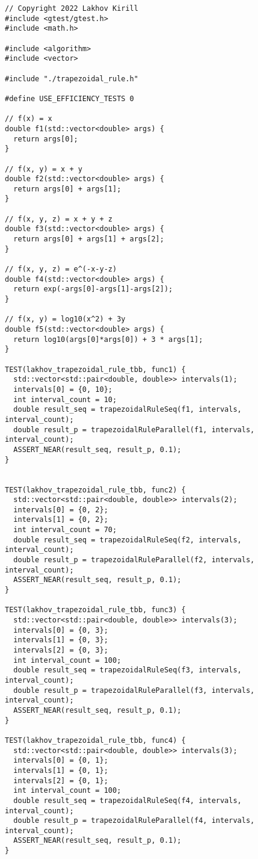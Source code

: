 \documentclass{report}
\begin{document}
\begin{lstlisting}
// Copyright 2022 Lakhov Kirill
#include <gtest/gtest.h>
#include <math.h>

#include <algorithm>
#include <vector>

#include "./trapezoidal_rule.h"

#define USE_EFFICIENCY_TESTS 0

// f(x) = x
double f1(std::vector<double> args) {
  return args[0];
}

// f(x, y) = x + y
double f2(std::vector<double> args) {
  return args[0] + args[1];
}

// f(x, y, z) = x + y + z
double f3(std::vector<double> args) {
  return args[0] + args[1] + args[2];
}

// f(x, y, z) = e^(-x-y-z)
double f4(std::vector<double> args) {
  return exp(-args[0]-args[1]-args[2]);
}

// f(x, y) = log10(x^2) + 3y
double f5(std::vector<double> args) {
  return log10(args[0]*args[0]) + 3 * args[1];
}

TEST(lakhov_trapezoidal_rule_tbb, func1) {
  std::vector<std::pair<double, double>> intervals(1);
  intervals[0] = {0, 10};
  int interval_count = 10;
  double result_seq = trapezoidalRuleSeq(f1, intervals, interval_count);
  double result_p = trapezoidalRuleParallel(f1, intervals, interval_count);
  ASSERT_NEAR(result_seq, result_p, 0.1);
}


TEST(lakhov_trapezoidal_rule_tbb, func2) {
  std::vector<std::pair<double, double>> intervals(2);
  intervals[0] = {0, 2};
  intervals[1] = {0, 2};
  int interval_count = 70;
  double result_seq = trapezoidalRuleSeq(f2, intervals, interval_count);
  double result_p = trapezoidalRuleParallel(f2, intervals, interval_count);
  ASSERT_NEAR(result_seq, result_p, 0.1);
}

TEST(lakhov_trapezoidal_rule_tbb, func3) {
  std::vector<std::pair<double, double>> intervals(3);
  intervals[0] = {0, 3};
  intervals[1] = {0, 3};
  intervals[2] = {0, 3};
  int interval_count = 100;
  double result_seq = trapezoidalRuleSeq(f3, intervals, interval_count);
  double result_p = trapezoidalRuleParallel(f3, intervals, interval_count);
  ASSERT_NEAR(result_seq, result_p, 0.1);
}

TEST(lakhov_trapezoidal_rule_tbb, func4) {
  std::vector<std::pair<double, double>> intervals(3);
  intervals[0] = {0, 1};
  intervals[1] = {0, 1};
  intervals[2] = {0, 1};
  int interval_count = 100;
  double result_seq = trapezoidalRuleSeq(f4, intervals, interval_count);
  double result_p = trapezoidalRuleParallel(f4, intervals, interval_count);
  ASSERT_NEAR(result_seq, result_p, 0.1);
}


\end{lstlisting}
\end{document}
